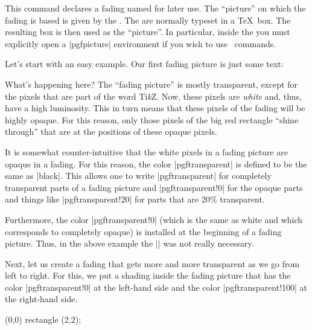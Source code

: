 \begin{command}{\pgfdeclarefading{}}
    This command declares a fading named  for later use. The
    ``picture'' on which the fading is based is given by the .
    The  are normally typeset in a \TeX\ box. The resulting box
    is then used as the ``picture''. In particular, inside the 
    you must explicitly open a |{pgfpicture}| environment if you wish to use
    \pgfname\ commands.

    Let's start with an easy example. Our first fading picture is just some
    text:
\begin{codeexample}[]
\end{codeexample}
    What's happening here? The ``fading picture'' is mostly transparent, except
    for the pixels that are part of the word Ti\emph{k}Z. Now, these pixels are
    \emph{white} and, thus, have a high luminosity. This in turn means that
    these pixels of the fading will be highly opaque. For this reason, only
    those pixels of the big red rectangle ``shine through'' that are at the
    positions of these opaque pixels.

    It is somewhat counter-intuitive that the white pixels in a fading picture
    are opaque in a fading. For this reason, the color |pgftransparent| is
    defined to be the same as |black|. This allows one to write
    |pgftransparent| for completely transparent parts of a fading picture and
    |pgftransparent!0| for the opaque parts and things like |pgftransparent!20|
    for parts that are 20\% transparent.

    Furthermore, the color |pgftransparent!0| (which is the same as white and
    which corresponds to completely opaque) is installed at the beginning of a
    fading picture. Thus, in the above example the |\color{white}| was not
    really necessary.

    Next, let us create a fading that gets more and more transparent as we go
    from left to right. For this, we put a shading inside the fading picture
    that has the color |pgftransparent!0| at the left-hand side and the color
    |pgftransparent!100| at the right-hand side.
\begin{codeexample}[]
{\tikz \shade[left color=pgftransparent!0,
              right color=pgftransparent!100] (0,0) rectangle (2,2);}
\end{codeexample}


\end{command}
